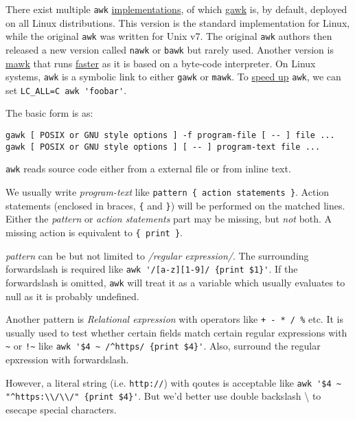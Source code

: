 There exist multiple \verb|awk|
\href{https://superuser.com/questions/75875/awk-mawk-nawk-gawk-what}{implementations},
of which \href{https://www.gnu.org/software/gawk/gawk.html}{gawk}
is, by default, deployed on all Linux distributions. This version
is the standard implementation for Linux, while the original
\verb|awk| was written for Unix v7. The original \verb|awk|
authors then released a new version called \verb|nawk| or
\verb|bawk| but rarely used. Another version is
\href{https://invisible-island.net/mawk/mawk.html}{mawk} that runs
\href{https://brenocon.com/blog/2009/09/dont-mawk-awk-the-fastest-and-most-elegant-big-data-munging-language/}{faster}
as it is based on a byte-code interpreter. On Linux systems,
\verb|awk| is a symbolic link to either \verb|gawk| or
\verb|mawk|. To
\href{https://stackoverflow.com/questions/33426591/awk-vs-nawk-vs-mawk-processing-heavy-files}{speed
  up} \verb|awk|, we can set \verb|LC_ALL=C awk 'foobar'|.

The basic form is as:

\begin{lstlisting}
gawk [ POSIX or GNU style options ] -f program-file [ -- ] file ...
gawk [ POSIX or GNU style options ] [ -- ] program-text file ...
\end{lstlisting}

\lstinline|awk| reads source code either from a external file or
from inline text.

We usually write \textit{program-text} like
\verb|pattern { action statements }|. Action statements (enclosed
in braces, \lstinline|{| and \lstinline|}|) will be performed on
the matched lines. Either the \textit{pattern} or \textit{action
  statements} part may be missing, but \textit{not} both. A
missing action is equivalent to \lstinline|{ print }|.

\textit{pattern} can be but not limited to \textit{/regular
  expression/}. The surrounding forwardslash is required like
\lstinline|awk '/[a-z][1-9]/ {print $1}'|. If the forwardslash is
omitted, \lstinline|awk| will treat it as a variable which usually
evaluates to null as it is probably undefined.

Another pattern is \textit{Relational expression} with operators
like \lstinline|+ - * / %| etc. It is
usually used to test whether certain fields match certain regular
expressions with \lstinline|~| or \lstinline|!~| like
\lstinline|awk '$4 ~ /^https/ {print $4}'|. Also, surround the
regular epxression with forwardslash.

However, a literal string (i.e. \texttt{http://}) with qoutes is
acceptable like \lstinline|awk '$4 ~ "^https:\\/\\/" {print $4}'|.
But we'd better use double backslash \textbackslash{} to
esecape special characters.

